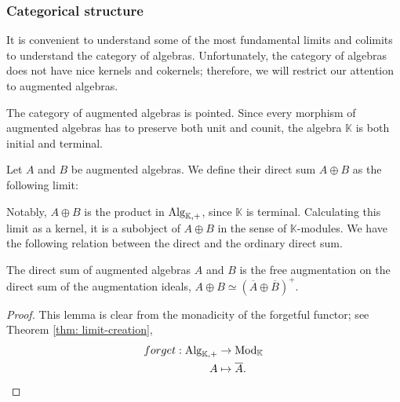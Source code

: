 \documentclass[../thesis.tex]{subfiles}
\begin{document}
            \subsubsection*{Categorical structure}

                It is convenient to understand some of the most fundamental limits and colimits to understand the category of algebras. Unfortunately, the category of algebras does not have nice kernels and cokernels; therefore, we will restrict our attention to augmented algebras.

                The category of augmented algebras is pointed. Since every morphism of augmented algebras has to preserve both unit and counit, the algebra $\mathbb{K}$ is both initial and terminal.

                \begin{definition}
                    Let $A$ and $B$ be augmented algebras. We define their direct sum $A \oplus B$ as the following limit:
                    \begin{center}
                    \end{center}
                \end{definition}

                Notably, $A \oplus B$ is the product in $\tt{Alg}_{\mathbb{K},+}$, since $\mathbb{K}$ is terminal. Calculating this limit as a kernel, it is a subobject of $A \oplus B$ in the sense of $\mathbb{K}$-modules. We have the following relation between the direct and the ordinary direct sum.

                \begin{lemma}
                    The direct sum of augmented algebras $A$ and $B$ is the free augmentation on the direct sum of the augmentation ideals, $A \oplus B \simeq (\overline{A} \oplus \overline{B})^+$.
                \end{lemma}

                \begin{proof}
                    This lemma is clear from the monadicity of the forgetful functor; see Theorem \ref{thm: limit-creation},
                    \begin{align*}
                        forget : \tt{Alg}_{\mathbb{K},+} & \rightarrow \tt{Mod}_{\mathbb{K}} \\
                        A & \mapsto \overline{A}\tt{.}
                    \end{align*}
                \end{proof}
\end{document}
